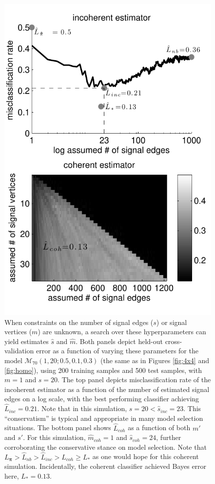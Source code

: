 \documentclass[10pt,journal,cspaper,compsoc]{IEEEtran}
\providecommand{\mc}[1]{\mathcal{#1}}
\providecommand{\mb}[1]{\boldsymbol{#1}}
\providecommand{\mh}[1]{\hat{#1}}
\begin{document}
\begin{figure}[htbp]
	\centering
		\includegraphics[width=0.8\linewidth]{../figs/coherent_image_V70_s20_p10_q30_nTr200_nTe500.pdf}
	\caption{When constraints on the number of signal edges ($s$) or signal vertices ($m$) are unknown, a search over these hyperparameters can yield estimates $\mh{s}$ and $\mh{m}$.  Both panels depict held-out cross-validation error as a function of varying these parameters for the model 
	$\mc{M}_{70}(1,20;0.5,0.1,0.3)$
	(the same as in Figures \ref{fig:4x4} and \ref{fig:homo}), using 200 training samples and 500 test samples, with $m=1$ and $s=20$.  The top panel depicts misclassification rate of the incoherent estimator as a function of the number of estimated signal edges on a log scale, with the best performing classifier achieving $\mh{L}_{inc}=0.21$. Note that in this simulation,  $s=20< \mh{s}_{inc}=23$.  This ``conservatism'' is typical and appropriate in many model selection situations.  The bottom panel shows $\mh{L}_{coh}$ as a function of both $m'$ and $s'$.  For this simulation, $\mh{m}_{coh}=1$ and $\mh{s}_{coh}=24$, further corroborating the conservative stance on model selection. Note that $L_{\mb{\pi}} > \mh{L}_{nb} > \mh{L}_{inc} > \mh{L}_{coh} \geq L_*$ as one would hope for this coherent simulation.  Incidentally, the coherent classifier achieved Bayes error here, $L_*=0.13$.}
	\label{fig:coherent}
\end{figure}
\end{document}
